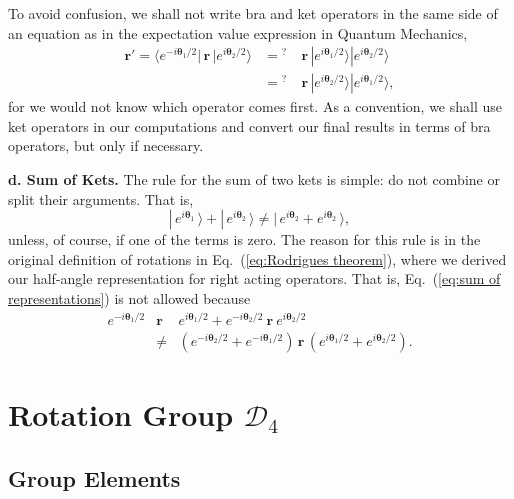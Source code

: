 \documentclass[11pt,twocolumn]{article}
\begin{document}
To avoid confusion, we shall not write bra and ket operators in the same side of an equation as in the expectation value expression in Quantum Mechanics,
\begin{eqnarray}
\label{eq:r' is bra r ket}
\mathbf r'=\langle e^{-i\bm\theta_1/2}|\,\mathbf r\,|e^{i\bm\theta_2/2}\rangle&=\!\!\!\!\!^?&\ \mathbf r\,|e^{i\bm\theta_1/2}\rangle|e^{i\bm\theta_2/2}\rangle\nonumber\\
&=\!\!\!\!\!^?&\ \mathbf r\,|e^{i\bm\theta_2/2}\rangle|e^{i\bm\theta_1/2}\rangle,
\end{eqnarray}
for we would not know which operator comes first.  As a convention, we shall use ket operators in our computations and convert our final results in terms of bra operators, but only if necessary.
 

\textbf{d.  Sum of Kets.} The rule for the sum of two kets is simple: do not combine or split their arguments.  That is,
\begin{equation}
\label{eq:sum of representations}
|\,e^{i\bm\theta_1}\,\rangle+|\,e^{i\bm\theta_2}\,\rangle\neq|\,e^{i\bm\theta_2}+e^{i\bm\theta_2}\,\rangle,
\end{equation}
unless, of course, if one of the terms is zero.  The reason for this rule is in the original definition of rotations in Eq.~(\ref{eq:Rodrigues theorem}), where we derived our half-angle representation for right acting operators.  That is, Eq.~(\ref{eq:sum of representations}) is not allowed because
\begin{eqnarray}
e^{-i\bm\theta_1/2}\!\!\!\!&\mathbf r&\!\!\!\!e^{i\bm\theta_1/2}+e^{-i\bm\theta_2/2}\ \mathbf r\ e^{i\bm\theta_2/2}\nonumber\\
&\neq&\!\!(e^{-i\bm\theta_2/2}+e^{-i\bm\theta_1/2})\,\mathbf r\,(e^{i\bm\theta_1/2}+e^{i\bm\theta_2/2}).
\end{eqnarray}

\section{Rotation Group $\mathcal D_4$}
\subsection{Group Elements}
\end{document}
